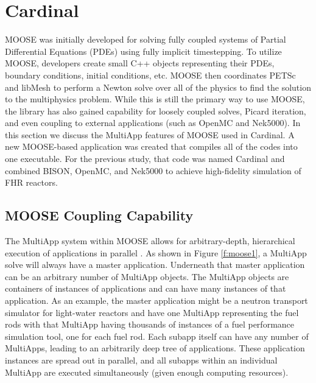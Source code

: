 \section{Cardinal}
\label{s:cardinal}

MOOSE was initially developed for solving fully coupled systems of Partial
Differential Equations (PDEs) using fully implicit timestepping. To utilize
MOOSE, developers create small C++ objects representing their PDEs, boundary
conditions, initial conditions, etc. MOOSE then coordinates PETSc and
libMesh \cite{kirk2006libmesh} to perform a Newton solve over all of the
physics to find the solution to the multiphysics problem. While this is still
the primary way to use MOOSE, the library has also gained capability for
loosely coupled solves, Picard iteration, and even coupling to external
applications (such as OpenMC and Nek5000).  In this section we discuss the
MultiApp features of MOOSE used in Cardinal.  A new MOOSE-based application was
created \cite{cardinal}  that compiles all of the codes into one executable.
For the previous study, that code was named Cardinal and combined BISON,
OpenMC, and Nek5000 to achieve high-fidelity simulation of FHR reactors.

\subsection{MOOSE Coupling Capability}

The MultiApp system within MOOSE allows for arbitrary-depth, hierarchical execution of applications in parallel \cite{gaston2015physics}. As shown in Figure \ref{f:moose1}, a MultiApp solve will always have a master application. Underneath that master application can be an arbitrary number of MultiApp objects. The MultiApp objects are containers of instances of applications and can have many instances of that application. As an example, the master application might be a neutron transport simulator for light-water reactors and have one MultiApp representing the fuel rods with that MultiApp having thousands of instances of a fuel performance simulation tool, one for each fuel rod. Each subapp itself can have any number of MultiApps, leading to an arbitrarily deep tree of applications. These application instances are spread out in parallel, and all subapps within an individual MultiApp are executed simultaneously (given enough computing resources).

